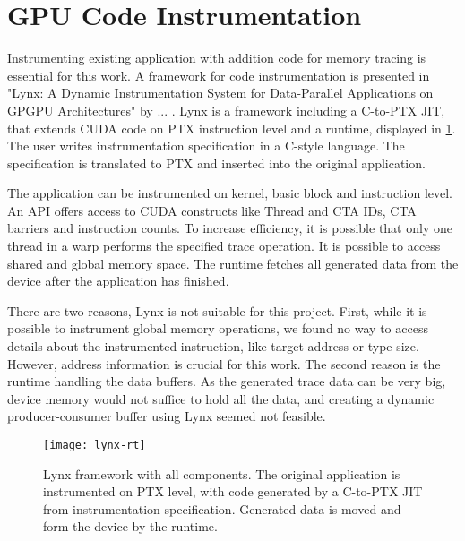 \section{GPU Code Instrumentation}
Instrumenting existing application with addition code for memory tracing is essential for this work.
A framework for code instrumentation is presented in "Lynx: A Dynamic Instrumentation System for Data-Parallel Applications on GPGPU Architectures" \cite{lynx} by ... . Lynx is a framework including a C-to-PTX JIT, that extends CUDA code on PTX instruction level and a runtime, displayed in \ref{lynx-rt}. The user writes instrumentation specification in a C-style language. The specification is translated to PTX and inserted into the original application.

The application can be instrumented on kernel, basic block and instruction level. An API offers access to CUDA constructs like Thread and CTA IDs, CTA barriers and instruction counts. To increase
efficiency, it is possible that only one thread in a warp performs the specified trace operation. It is possible to access shared and global memory space. The runtime fetches all generated data from the device after the application has finished.

There are two reasons, Lynx is not suitable for this project. First, while it is possible to instrument global memory operations, we found no way to access details about the instrumented instruction, like target address or type size. However, address information is crucial for this work. The second reason
is the runtime handling the data buffers. As the generated trace data can be very big, device memory would not suffice to hold all the data, and creating a dynamic producer-consumer buffer using Lynx seemed not feasible. 
\begin{figure}[t]
	\centering
	\texttt{[image: lynx-rt]}
	\caption{Lynx framework with all components. The original application is instrumented on PTX level, with code generated by a C-to-PTX JIT from instrumentation specification. Generated data is moved and form the device by the runtime.}
	\label{lynx-rt}
\end{figure}
